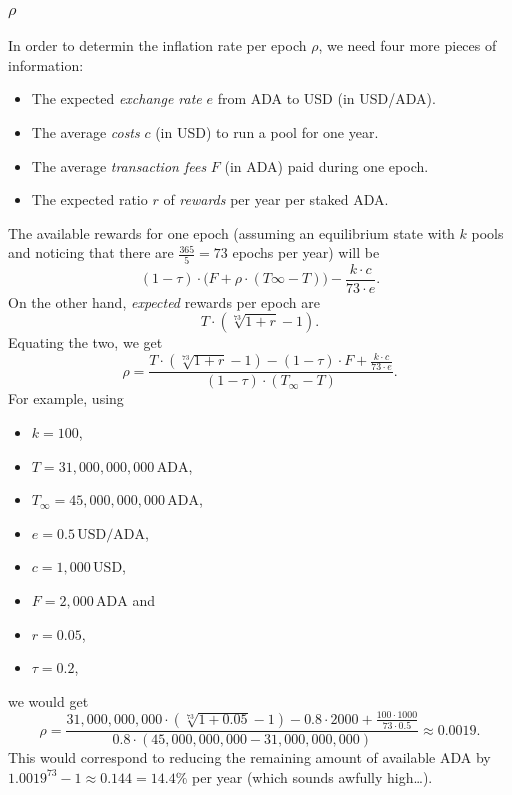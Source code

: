 \documentclass[11pt,a4paper]{article}
\begin{document}
\subsubsection{\texorpdfstring{\(\rho\)}{\textbackslash{}rho}}\label{rho}

In order to determin the inflation rate per epoch \(\rho\), we need four
more pieces of information:

\begin{itemize}
\item
  The expected \emph{exchange rate} \(e\) from ADA to USD (in USD/ADA).
\item
  The average \emph{costs} \(c\) (in USD) to run a pool for one year.
\item
  The average \emph{transaction fees} \(F\) (in ADA) paid during one
  epoch.
\item
  The expected ratio \(r\) of \emph{rewards} per year per staked ADA.
\end{itemize}

The available rewards for one epoch (assuming an equilibrium state with
\(k\) pools and noticing that there are \(\frac{365}{5}=73\) epochs per
year) will be \[
    \left(1-\tau\right)\cdot\bigl(F + \rho\cdot\left(T\infty - T\right)\bigr) - \frac{k\cdot c}{73\cdot e}.
\] On the other hand, \emph{expected} rewards per epoch are \[
    T\cdot\left(\sqrt[73]{1+r}-1\right).
\] Equating the two, we get \[
    \rho=\frac{T\cdot\left(\sqrt[73]{1+r}-1\right)-(1-\tau)\cdot F+\frac{k\cdot c}{73\cdot e}}{\left(1-\tau\right)\cdot\left(T_\infty-T\right)}.
\] For example, using

\begin{itemize}
\item
  \(k=100\),
\item
  \(T=31,000,000,000\,\mathrm{ADA}\),
\item
  \(T_\infty=45,000,000,000\,\mathrm{ADA}\),
\item
  \(e=0.5\,\mathrm{USD/ADA}\),
\item
  \(c=1,000\,\mathrm{USD}\),
\item
  \(F=2,000\,\mathrm{ADA}\) and
\item
  \(r=0.05\),
\item
  \(\tau=0.2\),
\end{itemize}

we would get \[
    \rho=\frac
        {31,000,000,000\cdot\left(\sqrt[73]{1+0.05}-1\right)-0.8\cdot 2000+\frac{100\cdot 1000}{73\cdot 0.5}}
        {0.8\cdot\left(45,000,000,000 - 31,000,000,000\right)}
    \approx
    0.0019.
\] This would correspond to reducing the remaining amount of available
ADA by \({1.0019}^{73}-1\approx 0.144=14.4\%\) per year (which sounds
awfully high\ldots).
\end{document}
